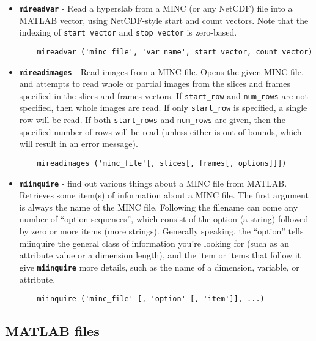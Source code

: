 \documentclass[11pt]{article}
\def\code#1{{\tt \bf #1}}
\begin{document}
\begin{itemize}

\item \code{mireadvar} - Read a hyperslab from a MINC (or any NetCDF)
file into a MATLAB vector, using NetCDF-style start and count
vectors.  Note that the indexing of \verb|start_vector| and
\verb|stop_vector| is zero-based.
\begin{verbatim}
    mireadvar ('minc_file', 'var_name', start_vector, count_vector)
\end{verbatim}

\item \code{mireadimages} - Read images from a MINC file.  Opens the
given MINC file, and attempts to read whole or partial images from the
slices and frames specified in the slices and frames vectors.  If
\verb|start_row| and \verb|num_rows| are not specified, then whole
images are read.  If only \verb|start_row| is specified, a single row
will be read.  If both \verb|start_rows| and \verb|num_rows| are
given, then the specified number of rows will be read (unless either
is out of bounds, which will result in an error message).

\begin{verbatim}
    mireadimages ('minc_file'[, slices[, frames[, options]]]) 
\end{verbatim}

\item \code{miinquire} - find out various things about a MINC file
from MATLAB.  Retrieves some item(s) of information about a MINC file.
The first argument is always the name of the MINC file.  Following the
filename can come any number of ``option sequences'', which consist of
the option (a string) followed by zero or more items (more strings).
Generally speaking, the ``option'' tells miinquire the general class
of information you're looking for (such as an attribute value or a
dimension length), and the item or items that follow it give
\code{miinquire} more details, such as the name of a dimension,
variable, or attribute.

\begin{verbatim}
    miinquire ('minc_file' [, 'option' [, 'item']], ...)
\end{verbatim}

\end{itemize}

\newpage
\subsection{MATLAB files}
\label{emma_reference}


\end{document}
